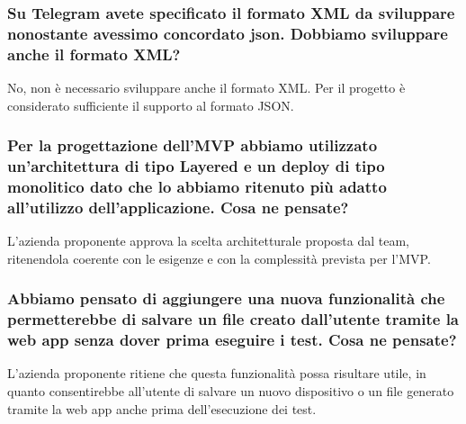 \documentclass[a4paper,12pt]{article}
\begin{document}
{    \subsubsection{Su Telegram avete specificato il formato XML da sviluppare nonostante avessimo concordato json. Dobbiamo sviluppare anche il formato XML?}
        No, non è necessario sviluppare anche il formato XML. Per il progetto è considerato sufficiente il supporto al formato JSON.

    \subsubsection{Per la progettazione dell'MVP abbiamo utilizzato un'architettura di tipo Layered e un deploy di tipo monolitico dato che lo abbiamo ritenuto più adatto all'utilizzo dell'applicazione. Cosa ne pensate?}
        L'azienda proponente approva la scelta architetturale proposta dal team, ritenendola coerente con le esigenze e con la complessità prevista per l'MVP.

    \subsubsection{Abbiamo pensato di aggiungere una nuova funzionalità che permetterebbe di salvare un file creato dall'utente tramite la web app senza dover prima eseguire i test. Cosa ne pensate?}
        L'azienda proponente ritiene che questa funzionalità possa risultare utile, in quanto consentirebbe all'utente di salvare un nuovo dispositivo o un file generato tramite la web app anche prima dell'esecuzione dei test.
}
\newpage
\end{document}
